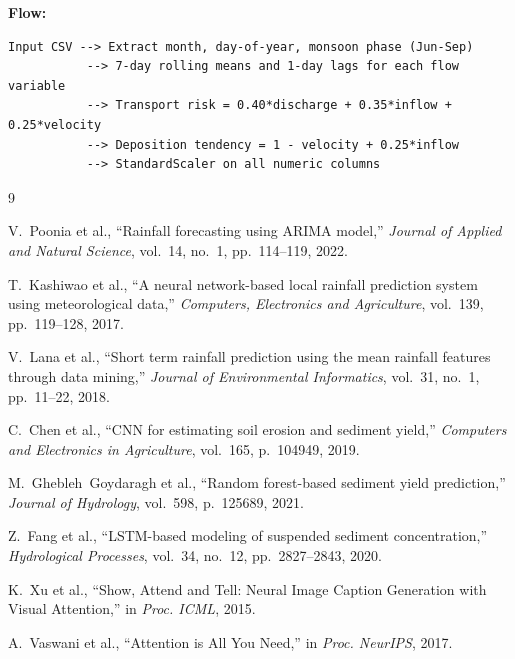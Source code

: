 \documentclass[twocolumn]{article}
\begin{document}
\textbf{Flow:}
\begin{verbatim}
Input CSV --> Extract month, day-of-year, monsoon phase (Jun-Sep)
           --> 7-day rolling means and 1-day lags for each flow variable
           --> Transport risk = 0.40*discharge + 0.35*inflow + 0.25*velocity
           --> Deposition tendency = 1 - velocity + 0.25*inflow
           --> StandardScaler on all numeric columns
\end{verbatim}


\begin{thebibliography}{9}

V.~Poonia et al., ``Rainfall forecasting using ARIMA model,'' \textit{Journal of Applied and Natural Science}, vol.~14, no.~1, pp.~114--119, 2022.

T.~Kashiwao et al., ``A neural network-based local rainfall prediction system using meteorological data,'' \textit{Computers, Electronics and Agriculture}, vol.~139, pp.~119--128, 2017.

V.~Lana et al., ``Short term rainfall prediction using the mean rainfall features through data mining,'' \textit{Journal of Environmental Informatics}, vol.~31, no.~1, pp.~11--22, 2018.

C.~Chen et al., ``CNN for estimating soil erosion and sediment yield,'' \textit{Computers and Electronics in Agriculture}, vol.~165, p.~104949, 2019.

M.~Ghebleh~Goydaragh et al., ``Random forest-based sediment yield prediction,'' \textit{Journal of Hydrology}, vol.~598, p.~125689, 2021.

Z.~Fang et al., ``LSTM-based modeling of suspended sediment concentration,'' \textit{Hydrological Processes}, vol.~34, no.~12, pp.~2827--2843, 2020.

K.~Xu et al., ``Show, Attend and Tell: Neural Image Caption Generation with Visual Attention,'' in \textit{Proc. ICML}, 2015.

A.~Vaswani et al., ``Attention is All You Need,'' in \textit{Proc. NeurIPS}, 2017.

\end{thebibliography}
\end{document}
